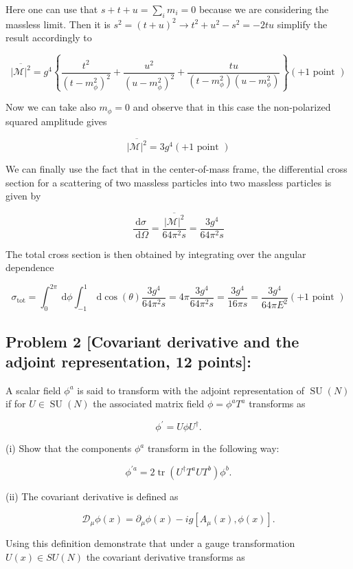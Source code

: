 \documentclass[10pt, letterpaper]{article}
\begin{document}
Here one can use that $s+t+u=\sum_i m_i=0$ because we are considering the massless limit. Then it is $s^2=(t+u)^2 \rightarrow t^2+u^2-s^2=-2 t u$ simplify the result accordingly to

$$
\overline{|\mathcal{M}|^2}=g^4\left\{\frac{t^2}{\left(t-m_\phi^2\right)^2}+\frac{u^2}{\left(u-m_\phi^2\right)^2}+\frac{t u}{\left(t-m_\phi^2\right)\left(u-m_\phi^2\right)}\right\}(+1 \text { point })
$$


Now we can take also $m_\phi=0$ and observe that in this case the non-polarized squared amplitude gives

$$
\overline{|\mathcal{M}|^2}=3 g^4(+1 \text { point })
$$


We can finally use the fact that in the center-of-mass frame, the differential cross section for a scattering of two massless particles into two massless particles is given by

$$
\frac{\mathrm{d} \sigma}{\mathrm{~d} \Omega}=\frac{\overline{|\mathcal{M}|^2}}{64 \pi^2 s}=\frac{3 g^4}{64 \pi^2 s}
$$


The total cross section is then obtained by integrating over the angular dependence

$$
\sigma_{\mathrm{tot}}=\int_0^{2 \pi} \mathrm{~d} \phi \int_{-1}^1 \mathrm{~d} \cos (\theta) \frac{3 g^4}{64 \pi^2 s}=4 \pi \frac{3 g^4}{64 \pi^2 s}=\frac{3 g^4}{16 \pi s}=\frac{3 g^4}{64 \pi E^2}(+1 \text { point })
$$



\subsection{Problem 2 [Covariant derivative and the adjoint representation, 12 points]: }

A scalar field $\phi^a$ is said to transform with the adjoint representation of $\operatorname{SU}(N)$ if for $U \in \operatorname{SU}(N)$ the associated matrix field $\phi=\phi^a T^a$ transforms as

$$
\phi^{\prime}=U \phi U^{\dagger} .
$$

(i) Show that the components $\phi^a$ transform in the following way:

$$
\phi^{\prime a}=2 \operatorname{tr}\left(U^{\dagger} T^a U T^b\right) \phi^b .
$$

(ii) The covariant derivative is defined as

$$
\mathcal{D}_\mu \phi(x)=\partial_\mu \phi(x)-i g\left[A_\mu(x), \phi(x)\right] .
$$


Using this definition demonstrate that under a gauge transformation $U(x) \in S U(N)$ the covariant derivative transforms as
\end{document}
